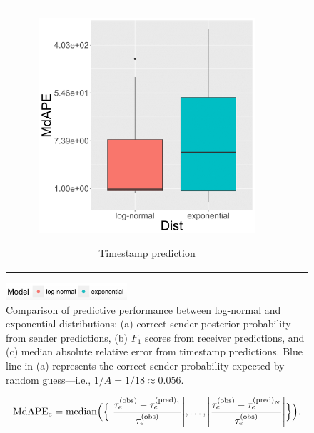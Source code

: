 \documentclass[ba]{imsart}
\numberwithin{equation}{section}
\theoremstyle{plain}
\DeclarePairedDelimiter\abs{\lvert}{\rvert}
\begin{document}
\begin{figure}[!t]
\begin{tabular}[t]{ccc}
\begin{subfigure}[b]{0.33\textwidth}
				\label{subfigure:PPEresults2}
			\end{subfigure}
			\begin{subfigure}[b]{0.33\textwidth}
				\caption{Timestamp prediction}
				\includegraphics[width=\textwidth]{img/timepredict-1.png}
				\label{subfigure:PPEresults3}	
			\end{subfigure}
		\end{tabular}
		\includegraphics[width=0.4\textwidth]{img/modellabel.png}				
		\caption {Comparison of predictive performance between log-normal and exponential distributions: (a) correct sender posterior probability from sender predictions, (b) $F_1$ scores from receiver predictions, and (c) median absolute relative error from timestamp predictions. Blue line in (a) represents the correct sender probability expected by random guess---i.e., $1/A=1/18\approx0.056$.}
		\label{figure:PPEresults}
	\end{figure}		
	\begin{equation}
		\mbox{MdAPE}_{e} = \mbox{median}\Big(\Big\{\abs*{\frac{\tau^{\textrm{(obs)}}_e - \tau^{\textrm{(pred)}_1}_{e}}{\tau^{\textrm{(obs)}}_e}},\ldots, \abs*{\frac{\tau^{\textrm{(obs)}}_e - \tau^{\textrm{(pred)}_N}_{e}}{\tau^{\textrm{(obs)}}_e}}\Big\}\Big).
	\end{equation}
\end{document}
